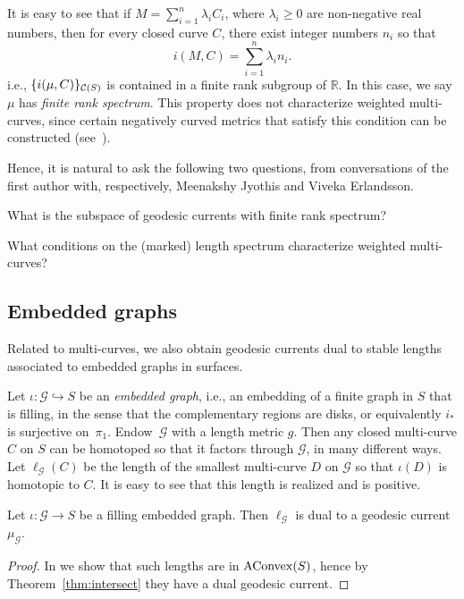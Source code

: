It is easy to see that if $M = \sum_{i=1}^n \lambda_i C_i$, where $\lambda_i \geq 0$ are non-negative real numbers, then for every closed curve $C$, there exist integer numbers $n_i$ so that
\begin{equation}
i(M, C) = \sum_{i=1}^n \lambda_i n_i.
\label{eq:weighted_multicurve}
\end{equation}
i.e., $\{i(\mu,C)\}_{\mathcal{C}(S)}$ is contained in a finite rank subgroup of $\mathbb{R}$. In this case, we say $\mu$ has \emph{finite rank spectrum}.
This property does not characterize weighted multi-curves, since certain negatively curved metrics that satisfy this condition can be constructed (see~\cite{Agol25:Spectrum}).

Hence, it is natural to ask the following two questions, from
conversations of the first author with, respectively, Meenakshy
Jyothis and Viveka Erlandsson.

\begin{question}
    What is the subspace of geodesic currents with finite rank spectrum?
\end{question}

\begin{question}
    What conditions on the (marked) length spectrum characterize weighted multi-curves?
\end{question}

\subsection{Embedded graphs}
\label{subsec:embedded_graphs}
Related to multi-curves, we also obtain geodesic currents dual to stable lengths associated to embedded graphs in surfaces.

 Let $\iota \colon \mathcal{G} \hookrightarrow S$ be an \emph{embedded
   graph}, i.e., an embedding of a finite graph in $S$ that is
 filling, in the sense that the complementary regions are disks, or
 equivalently $i_*$ is surjective on~$\pi_1$.
Endow~$\mathcal{G}$ with a length metric $g$. Then any closed
multi-curve $C$ on $S$ can be homotoped so that it factors through
$\mathcal{G}$, in many different ways. Let $\ell_{\mathcal{G}}(C)$ be
the length of the smallest
 multi-curve $D$ on $\mathcal{G} $ so that $\iota(D)$ is homotopic to $C$. It is easy to see that this length is realized and is positive. 

\begin{theorem}
Let $\iota \colon \mathcal{G} \to S$ be a filling embedded graph. Then $\ell_{\mathcal{G}}$ is dual to a geodesic current $\mu_{\mathcal{G} }$.
\label{thm:dual_embeddedgraph}
\end{theorem}
\begin{proof}
In \cite[Sec.\ 4.4]{MGT21:Smoothings} we show that such lengths are in $\mathrm{AConvex}(S)$, hence by Theorem~\ref{thm:intersect} they have a dual geodesic current. 
\end{proof}

